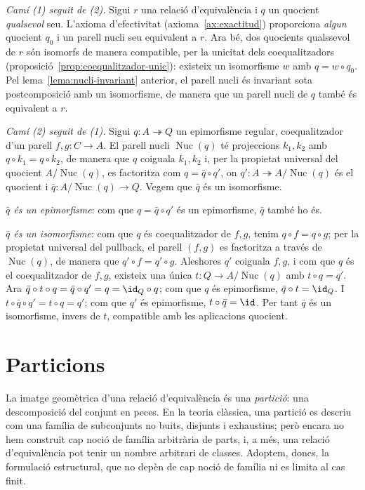 \begin{prova}
\emph{Camí (1) seguit de (2).} Sigui \(r\) una relació d'equivalència i \(q\) un quocient \emph{qualsevol} seu. L'axioma d'efectivitat (axioma~\ref{ax:exactitud}) proporciona \emph{algun} quocient \(q_0\) i un parell nucli seu equivalent a \(r\). Ara bé, dos quocients qualssevol de \(r\) són isomorfs de manera compatible, per la unicitat dels coequalitzadors (proposició~\ref{prop:coequalitzador-unic}): existeix un isomorfisme \(w\) amb \(q=w\circ q_0\). Pel lema~\ref{lema:nucli-invariant} anterior, el parell nucli és invariant sota postcomposició amb un isomorfisme, de manera que un parell nucli de \(q\) també és equivalent a \(r\).

\emph{Camí (2) seguit de (1).} Sigui \(q\colon A\twoheadrightarrow Q\) un epimorfisme regular, coequalitzador d'un parell \(f,g\colon C\to A\). El parell nucli \(\operatorname{Nuc}(q)\) té projeccions \(k_1,k_2\) amb \(q\circ k_1=q\circ k_2\), de manera que \(q\) coiguala \(k_1,k_2\) i, per la propietat universal del quocient \(A/\operatorname{Nuc}(q)\), es factoritza com \(q=\bar q\circ q'\), on \(q'\colon A\twoheadrightarrow A/\operatorname{Nuc}(q)\) és el quocient i \(\bar q\colon A/\operatorname{Nuc}(q)\to Q\). Vegem que \(\bar q\) és un isomorfisme.

\emph{\(\bar q\) és un epimorfisme}: com que \(q=\bar q\circ q'\) és un epimorfisme, \(\bar q\) també ho és.

\emph{\(\bar q\) és un isomorfisme}: com que \(q\) és coequalitzador de \(f,g\), tenim \(q\circ f=q\circ g\); per la propietat universal del pullback, el parell \((f,g)\) es factoritza a través de \(\operatorname{Nuc}(q)\), de manera que \(q'\circ f=q'\circ g\). Aleshores \(q'\) coiguala \(f,g\), i com que \(q\) és el coequalitzador de \(f,g\), existeix una única \(t\colon Q\to A/\operatorname{Nuc}(q)\) amb \(t\circ q=q'\). Ara \(\bar q\circ t\circ q=\bar q\circ q'=q=\id_Q\circ q\); com que \(q\) és epimorfisme, \(\bar q\circ t=\id_Q\). I \(t\circ\bar q\circ q'=t\circ q=q'\); com que \(q'\) és epimorfisme, \(t\circ\bar q=\id\). Per tant \(\bar q\) és un isomorfisme, invers de \(t\), compatible amb les aplicacions quocient.
\end{prova}

\section{Particions}\label{sec:particions}

La imatge geomètrica d'una relació d'equivalència és una \emph{partició}: una descomposició del conjunt en peces. En la teoria clàssica, una partició es descriu com una família de subconjunts no buits, disjunts i exhaustius; però encara no hem construït cap noció de família arbitrària de parts, i, a més, una relació d'equivalència pot tenir un nombre arbitrari de classes. Adoptem, doncs, la formulació estructural, que no depèn de cap noció de família ni es limita al cas finit.

